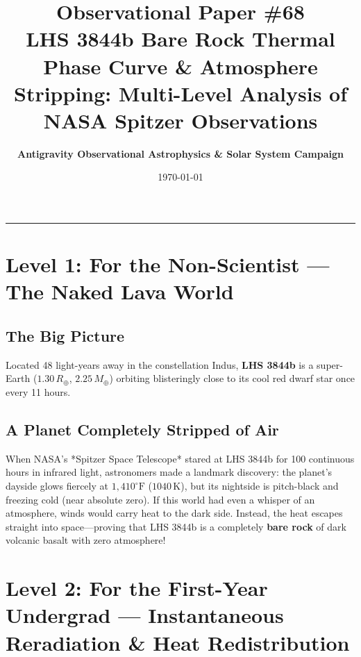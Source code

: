 \documentclass[11pt,a4paper]{article}
\title{\Huge \textbf{Observational Paper \#68}\\ \Large LHS 3844b Bare Rock Thermal Phase Curve \& Atmosphere Stripping: Multi-Level Analysis of NASA Spitzer Observations}
\author{\textbf{Antigravity Observational Astrophysics \& Solar System Campaign}}
\date{\today}
\begin{document}
\maketitle

\vspace{-1em}
\begin{center}
\rule{\textwidth}{1.5pt}
\end{center}

\section*{Level 1: For the Non-Scientist — The Naked Lava World}

\subsection*{The Big Picture}
Located 48 light-years away in the constellation Indus, \textbf{LHS 3844b} is a super-Earth ($1.30\,R_\oplus$, $2.25\,M_\oplus$) orbiting blisteringly close to its cool red dwarf star once every 11 hours.

\subsection*{A Planet Completely Stripped of Air}
When NASA's *Spitzer Space Telescope* stared at LHS 3844b for 100 continuous hours in infrared light, astronomers made a landmark discovery: the planet's dayside glows fiercely at $1,410^\circ\text{F}$ ($1040\,\text{K}$), but its nightside is pitch-black and freezing cold (near absolute zero). If this world had even a whisper of an atmosphere, winds would carry heat to the dark side. Instead, the heat escapes straight into space—proving that LHS 3844b is a completely \textbf{bare rock} of dark volcanic basalt with zero atmosphere!

\newpage

\section*{Level 2: For the First-Year Undergrad — Instantaneous Reradiation \& Heat Redistribution}
\end{document}
